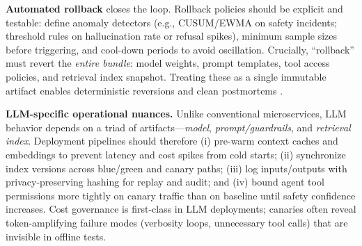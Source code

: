 \noindent\textbf{Automated rollback} closes the loop. Rollback policies should be explicit and testable: define anomaly detectors (e.g., CUSUM/EWMA on safety incidents; threshold rules on hallucination rate or refusal spikes), minimum sample sizes before triggering, and cool-down periods to avoid oscillation. Crucially, ``rollback'' must revert the \emph{entire bundle}: model weights, prompt templates, tool access policies, and retrieval index snapshot. Treating these as a single immutable artifact enables deterministic reversions and clean postmortems \cite{rohan_llmops}.

\medskip
\noindent\textbf{LLM-specific operational nuances.}
Unlike conventional microservices, LLM behavior depends on a triad of artifacts---\emph{model}, \emph{prompt/guardrails}, and \emph{retrieval index}. Deployment pipelines should therefore (i) pre-warm context caches and embeddings to prevent latency and cost spikes from cold starts; (ii) synchronize index versions across blue/green and canary paths; (iii) log inputs/outputs with privacy-preserving hashing for replay and audit; and (iv) bound agent tool permissions more tightly on canary traffic than on baseline until safety confidence increases. Cost governance is first-class in LLM deployments; canaries often reveal token-amplifying failure modes (verbosity loops, unnecessary tool calls) that are invisible in offline tests.

